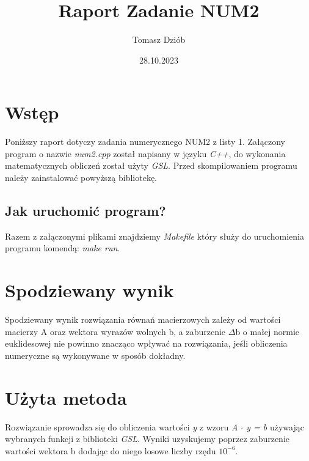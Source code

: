 \documentclass{article}
\title{Raport Zadanie NUM2}
\date{28.10.2023}
\author{Tomasz Dziób}
\begin{document}
  \maketitle
  \newpage
  \section{Wstęp}
  Poniższy raport dotyczy zadania numerycznego NUM2 z listy 1.
  Załączony program o nazwie \textit{num2.cpp} został napisany w języku \textit{C++}, do wykonania
  matematycznych obliczeń został użyty \textit{GSL}. Przed skompilowaniem programu należy
  zainstalować powyższą bibliotekę.
    \subsection{Jak uruchomić program?}
    Razem z załączonymi plikami znajdziemy \textit{Makefile} który służy do
    uruchomienia programu komendą: \textit{make run}.
  \section{Spodziewany wynik}
  Spodziewany wynik rozwiązania równań macierzowych zależy od wartości macierzy A oraz wektora 
  wyrazów wolnych b, a zaburzenie $\Delta$b o małej normie euklidesowej nie powinno znacząco 
  wpływać na rozwiązania, jeśli obliczenia numeryczne są wykonywane w sposób dokładny.

  \section{Użyta metoda}
  Rozwiązanie sprowadza się do obliczenia wartości \textit{y} z wzoru \textit{A $\cdot$ y = b} używając
  wybranych funkcji z biblioteki \textit{GSL}. Wyniki uzyskujemy poprzez zaburzenie wartości 
  wektora b dodając do niego losowe liczby rzędu $10^{-6}$. 
\end{document}
